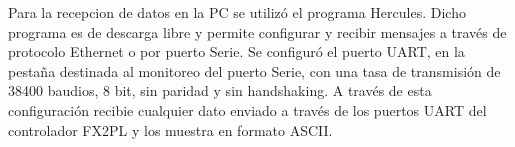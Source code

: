 



Para la recepcion de datos en la PC se utilizó el programa Hercules\cite{HWGroup}. Dicho programa es de descarga libre y permite configurar y recibir mensajes a través de protocolo Ethernet o por puerto Serie. Se configuró el puerto UART, en la pestaña destinada al monitoreo del puerto Serie, con una tasa de transmisión de 38400 baudios, 8 bit, sin paridad y sin handshaking. A través de esta configuración recibie cualquier dato enviado a través de los puertos UART del controlador FX2PL y los muestra en formato ASCII.

